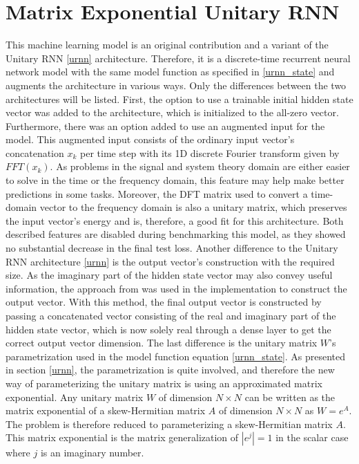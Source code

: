 \documentclass[draft,final]{vutinfth} %
\begin{document}
\section{Matrix Exponential Unitary RNN} \label{meurnn}
This machine learning model is an original contribution and a variant of the Unitary RNN \ref{urnn} architecture.
Therefore, it is a discrete-time recurrent neural network model with the same model function as specified in \ref{urnn_state} and augments the architecture in various ways.
Only the differences between the two architectures will be listed.
First, the option to use a trainable initial hidden state vector was added to the architecture, which is initialized to the all-zero vector.
Furthermore, there was an option added to use an augmented input for the model.
This augmented input consists of the ordinary input vector's concatenation $x_k$ per time step with its 1D discrete Fourier transform given by $FFT(x_k)$.
As problems in the signal and system theory domain are either easier to solve in the time or the frequency domain, this feature may help make better predictions in some tasks.
Moreover, the DFT matrix used to convert a time-domain vector to the frequency domain is also a unitary matrix, which preserves the input vector's energy and is, therefore, a good fit for this architecture.
Both described features are disabled during benchmarking this model, as they showed no substantial decrease in the final test loss.
Another difference to the Unitary RNN architecture \ref{urnn} is the output vector's construction with the required size.
As the imaginary part of the hidden state vector may also convey useful information, the approach from \cite[p. 4]{UnitaryRNNs} was used in the implementation to construct the output vector.
With this method, the final output vector is constructed by passing a concatenated vector consisting of the real and imaginary part of the hidden state vector, which is now solely real through a dense layer to get the correct output vector dimension.
The last difference is the unitary matrix $W$'s parametrization used in the model function equation \ref{urnn_state}.
As presented in section \ref{urnn}, the parametrization is quite involved, and therefore the new way of parameterizing the unitary matrix is using an approximated matrix exponential.
Any unitary matrix $W$ of dimension $N \times N$ can be written as the matrix exponential of a skew-Hermitian matrix $A$ of dimension $N \times N$ as $W=e^A$. The problem is therefore reduced to parameterizing a skew-Hermitian matrix $A$.
This matrix exponential is the matrix generalization of $|e^j|=1$ in the scalar case where $j$ is an imaginary number.
\end{document}
